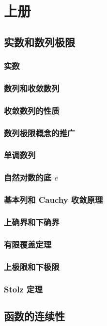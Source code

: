 \documentclass[a4paper, 11pt]{ctexbook}
\begin{document}
    \part{上册}
        \chapter{实数和数列极限}
            \section{实数}
            \section{数列和收敛数列}
            \section{收敛数列的性质}
            \section{数列极限概念的推广}
            \section{单调数列}
            \section{自然对数的底 \texorpdfstring{$e$}{e}}
            \section{基本列和 Cauchy 收敛原理}
            \section{上确界和下确界}
            \section{有限覆盖定理}
            \section{上极限和下极限}
            \section{Stolz 定理}
        \chapter{函数的连续性}
\end{document}
